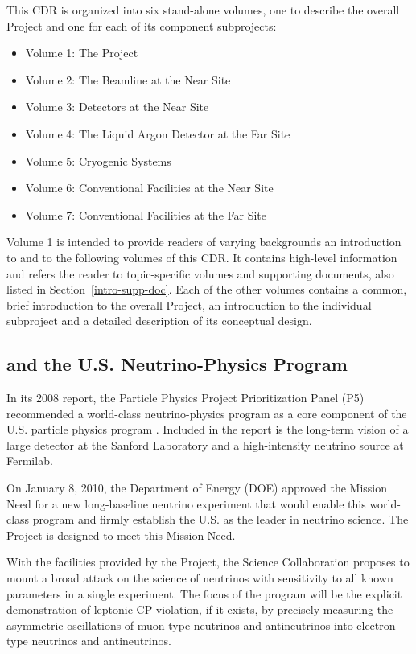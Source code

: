 This CDR is organized into six stand-alone volumes, one to describe the overall \expshort Project and one for each of its component subprojects: 
\begin{itemize}
\item Volume 1: The \expshort Project
\item Volume 2: The Beamline at the Near Site
\item Volume 3: Detectors at the Near Site
\item Volume 4: The Liquid Argon Detector at the Far Site
\item Volume 5: Cryogenic Systems
\item Volume 6: Conventional Facilities at the Near Site
\item Volume 7: Conventional Facilities at the Far Site
\end{itemize}

Volume 1 is intended to provide readers of varying backgrounds an introduction to \expshort and to the 
following volumes of this CDR.  It contains high-level information and refers the reader to topic-specific 
volumes and supporting documents, also listed in Section~\ref{intro-supp-doc}. 
Each of the other volumes contains a common, brief introduction to the overall \expshort Project, an 
introduction to the individual subproject and a detailed description of its conceptual design. 

\subsection{\expshort and the U.S. Neutrino-Physics Program}
In its 2008 report, the Particle Physics Project Prioritization Panel (P5) recommended a world-class
neutrino-physics program as a core component of the U.S. particle physics program \cite{p5report}. 
Included
in the report is the long-term vision of a large detector at the Sanford Laboratory and a high-intensity neutrino source at  Fermilab.

On January 8, 2010, the Department of Energy (DOE) approved the Mission Need for a new long-baseline
neutrino experiment that would enable this world-class program and firmly establish the
U.S. as the leader in neutrino science. The \expshort Project is designed to meet this Mission Need.

With the facilities provided by the \expshort Project, the \expshort Science Collaboration proposes to 
mount a broad attack on the science of neutrinos with sensitivity to all known parameters in a single 
experiment.  The focus of the program will be the explicit demonstration of leptonic CP violation, if it 
exists, by precisely measuring the asymmetric oscillations of muon-type neutrinos and antineutrinos into 
electron-type neutrinos and antineutrinos.

